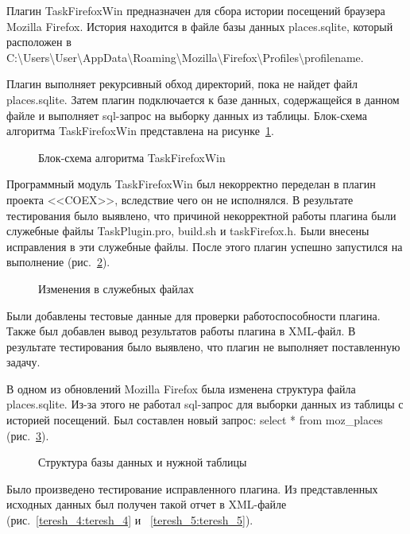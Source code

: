 Плагин TaskFirefoxWin предназначен для сбора истории посещений браузера Mozilla Firefox. История находится в файле базы данных places.sqlite, который расположен в C:\textbackslash Users\textbackslash User\textbackslash AppData\textbackslash Roaming\textbackslash Mozilla\textbackslash Firefox\textbackslash Profiles\textbackslash profilename.

Плагин выполняет рекурсивный обход директорий, пока не найдет файл places.sqlite. Затем плагин подключается к базе данных, содержащейся в данном файле и выполняет sql-запрос на выборку данных из таблицы. Блок-схема алгоритма TaskFirefoxWin представлена на рисунке~\ref{teresh_1:teresh_1}.

\begin{figure}[h!]
\caption{ Блок-схема алгоритма TaskFirefoxWin }
\label{teresh_1:teresh_1}
\end{figure}

Программный модуль TaskFirefoxWin был некорректно переделан в плагин проекта <<COEX>>, вследствие чего он не исполнялся. В результате тестирования было выявлено, что причиной некорректной работы плагина были служебные файлы TaskPlugin.pro, build.sh и taskFirefox.h. Были внесены исправления в эти служебные файлы. После этого плагин успешно запустился на выполнение (рис.~\ref{teresh_2:teresh_2}).

\begin{figure}[h!]
\caption{ Изменения в служебных файлах }
\label{teresh_2:teresh_2}
\end{figure}

Были добавлены тестовые данные для проверки работоспособности плагина. Также был добавлен вывод результатов работы плагина в XML-файл. В результате тестирования было выявлено, что плагин не выполняет поставленную задачу.

В одном из обновлений Mozilla Firefox была изменена структура файла places.sqlite. Из-за этого не работал sql-запрос для выборки данных из таблицы с историей посещений. Был составлен новый запрос: select * from moz\_places (рис.~\ref{teresh_3:teresh_3}).

\begin{figure}[h!]
\caption{ Структура базы данных и нужной таблицы }
\label{teresh_3:teresh_3}
\end{figure}

Было произведено тестирование исправленного плагина. Из представленных исходных данных был получен такой отчет в XML-файле (рис.~\ref{teresh_4:teresh_4} и ~\ref{teresh_5:teresh_5}). 

